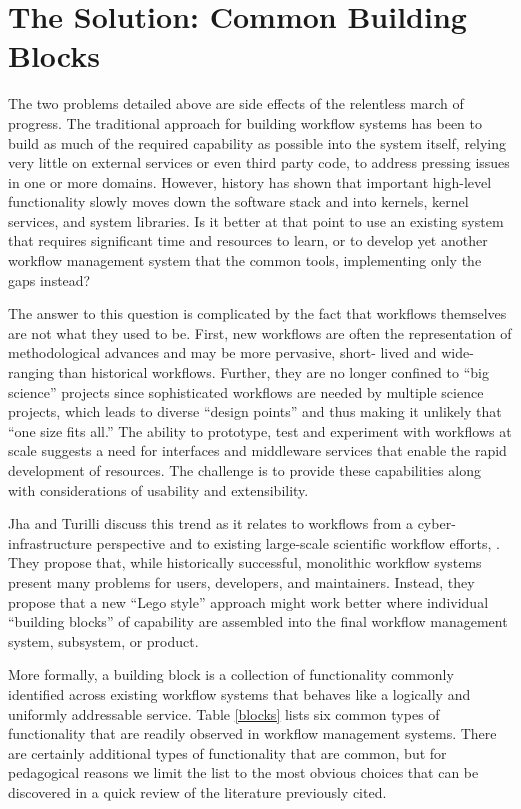 \section{The Solution: Common Building Blocks}\label{buildings-blocks}

The two problems detailed above are side effects of the relentless march of
progress. The traditional approach for building workflow systems has been to
build as much of the required capability as possible into the system itself,
relying very little on external services or even third party code, to address
pressing issues in one or more domains. However, history has shown that
important high-level functionality slowly moves down the software stack and
into kernels, kernel services, and system libraries. Is it better at that
point to use an existing system that requires significant time and resources
to learn, or to develop yet another workflow management system that the common
tools, implementing only the gaps instead?

The answer to this question is complicated by the fact that workflows
themselves are not what they used to be. First, new workflows are often the
representation of methodological advances and may be more pervasive,  short-
lived and wide-ranging than historical workflows. Further, they are no longer
confined to ``big science'' projects since sophisticated workflows are needed
by multiple science projects, which leads to diverse “design points” and thus
making it unlikely that ``one size fits all.''  The ability to prototype, test
and experiment with workflows at scale suggests a need for interfaces and
middleware services that enable the rapid development of resources. The
challenge is to provide these capabilities along with considerations of
usability and extensibility.

Jha and Turilli discuss this trend as it relates to workflows from a 
cyber-infrastructure perspective and to existing large-scale scientific workflow
efforts, \cite{jha_building_2016}. They propose that, while historically
successful, monolithic workflow systems present many problems for users,
developers, and maintainers. Instead, they propose that a new ``Lego style''
approach might work better where individual ``building blocks'' of capability
are assembled into the final workflow management system, subsystem, or
product.

More formally, a building block is a collection of functionality commonly
identified across existing workflow systems that behaves like a logically and
uniformly addressable service. Table \ref{blocks} lists six common types of
functionality that are readily observed in workflow management systems. There
are certainly additional types of functionality that are common, but for
pedagogical reasons we limit the list to the most obvious choices that can be
discovered in a quick review of the literature previously cited.

